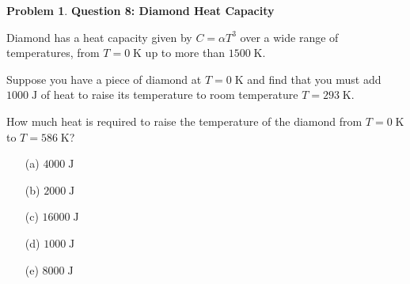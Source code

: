 \documentclass[10pt]{article}
\theoremstyle{definition} %
\newtheorem{problem}{Problem}
\theoremstyle{plain} %
\begin{document}
                                                          \begin{problem}
                                                            \textbf{Question 8: Diamond Heat Capacity}
                                                            
                                                            Diamond has a heat capacity given by \(C = \alpha T^{3}\) over a wide range
                                                            of temperatures, from \(T = 0\;\text{K}\) up to more than
                                                            \(1500\;\text{K}\).
                                                            
                                                            Suppose you have a piece of diamond at \(T = 0\;\text{K}\) and find that you
                                                            must add \(1000\;\text{J}\) of heat to raise its temperature to
                                                            room temperature \(T = 293\;\text{K}\).
                                                            
                                                            \medskip
                                                            How much heat is required to raise the temperature of the diamond from
                                                            \(T = 0\;\text{K}\) to \(T = 586\;\text{K}\)?
                                                            
                                                            \begin{enumerate}
                                                              \item[(a)] \(4000\;\text{J}\)
                                                              \item[(b)] \(2000\;\text{J}\)
                                                              \item[(c)] \(16000\;\text{J}\)
                                                              \item[(d)] \(1000\;\text{J}\)
                                                              \item[(e)] \(8000\;\text{J}\)
                                                            \end{enumerate}
                                                            \end{problem}
\end{document}
